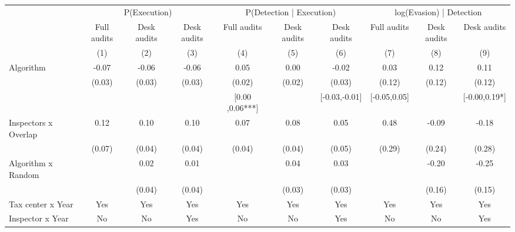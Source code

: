 \begin{tabular}{lccc|ccc|ccc} \toprule
\multicolumn{1}{l}{} & \multicolumn{3}{c}{P(Execution)} & \multicolumn{3}{c}{P(Detection | Execution)} & \multicolumn{3}{c}{log(Evasion) | Detection} \\\cmidrule(lr){2-4}\cmidrule(lr){5-7}\cmidrule(lr){8-10} \multicolumn{1}{l}{} & Full audits & Desk audits & Desk audits & Full audits & Desk audits & Desk audits & Full audits & Desk audits & Desk audits \\ \multicolumn{1}{l}{} & (1) & (2) & (3) & (4) & (5) & (6) & (7) & (8) & (9) \\ \midrule
Algorithm   &       -0.07\sym{**} &       -0.06\sym{**} &       -0.06\sym{**} &        0.05\sym{**} &        0.00         &       -0.02         &        0.03         &        0.12         &        0.11         \\
            &      (0.03)         &      (0.03)         &      (0.03)         &      (0.02)         &      (0.02)         &      (0.03)         &      (0.12)         &      (0.12)         &      (0.12)         \\
\addlinespace
 & & & & [0.00 ,0.06***] & & [-0.03,-0.01] & [-0.05,0.05] & & [-0.00,0.19*] \\  Inspectors x Overlap&        0.12\sym{*}  &        0.10\sym{**} &        0.10\sym{**} &        0.07\sym{*}  &        0.08\sym{**} &        0.05         &        0.48\sym{*}  &       -0.09         &       -0.18         \\
            &      (0.07)         &      (0.04)         &      (0.04)         &      (0.04)         &      (0.04)         &      (0.05)         &      (0.29)         &      (0.24)         &      (0.28)         \\
\addlinespace
Algorithm x Random&                     &        0.02         &        0.01         &                     &        0.04         &        0.03         &                     &       -0.20         &       -0.25\sym{*}  \\
            &                     &      (0.04)         &      (0.04)         &                     &      (0.03)         &      (0.03)         &                     &      (0.16)         &      (0.15)         \\
\midrule
Tax center x Year&         Yes         &         Yes         &         Yes         &         Yes         &         Yes         &         Yes         &         Yes         &         Yes         &         Yes         \\
Inspector x Year&          No         &          No         &         Yes         &          No         &          No         &         Yes         &          No         &          No         &         Yes         \\

\end{tabular}

